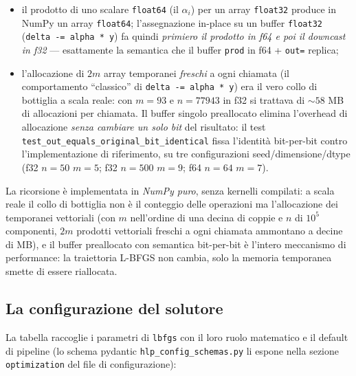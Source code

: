 \begin{itemize}
\item il prodotto di uno scalare \texttt{float64} (il $\alpha_i$) per un
  array \texttt{float32} produce in NumPy un array \texttt{float64};
  l'assegnazione in-place su un buffer \texttt{float32}
  (\texttt{delta -= alpha * y}) fa quindi \emph{primiero il prodotto in
  f64 e poi il downcast in f32} — esattamente la semantica che il buffer
  \texttt{prod} in f64 + \texttt{out=} replica;
\item l'allocazione di $2m$ array temporanei \emph{freschi} a ogni
  chiamata (il comportamento ``classico'' di
  \texttt{delta -= alpha * y}) era il vero collo di bottiglia a scala
  reale: con $m = 93$ e $n = 77943$ in f32 si trattava di $\sim 58$ MB
  di allocazioni per chiamata. Il buffer singolo preallocato elimina
  l'overhead di allocazione \emph{senza cambiare un solo bit} del
  risultato: il test \texttt{test\_out\_equals\_original\_bit\_identical}
  fissa l'identità bit-per-bit contro l'implementazione di riferimento,
  su tre configurazioni seed/dimensione/dtype (f32 $n=50$ $m=5$;
  f32 $n=500$ $m=9$; f64 $n=64$ $m=7$).
\end{itemize}

La ricorsione è implementata in \emph{NumPy puro}, senza kernelli
compilati: a scala reale il collo di bottiglia non è il conteggio delle
operazioni ma l'allocazione dei temporanei vettoriali (con $m$ nell'ordine
di una decina di coppie e $n$ di $10^5$ componenti, $2m$ prodotti
vettoriali freschi a ogni chiamata ammontano a decine di MB), e il buffer
preallocato con semantica bit-per-bit è l'intero meccanismo di
performance: la traiettoria L-BFGS non cambia, solo la memoria
temporanea smette di essere riallocata.

\subsection{La configurazione del solutore}

La tabella raccoglie i parametri di \texttt{lbfgs} con il loro ruolo
matematico e il default di pipeline (lo schema pydantic
\texttt{hlp\_config\_schemas.py} li espone nella sezione
\texttt{optimization} del file di configurazione):

